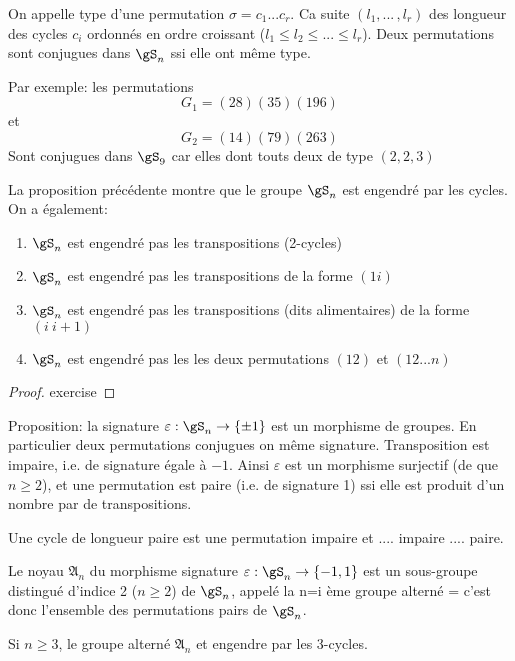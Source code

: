 \begin{proposition}
	On appelle type d'une permutation $\sigma=c_1... c_r$. Ca suite $(l_1,...\,,l_r)$ des longueur des cycles $c_i$ ordonnés en ordre croissant ($l_1\leq l_2\leq ... \leq l_r$).
	Deux permutations sont conjugues dans $\gS_n$ ssi elle ont même type.
\end{proposition}

Par exemple: les permutations
$$G_1=(28)(35)(196)$$
et
$$G_2=(14)(79)(263)$$
Sont conjugues dans $\gS_9$ car elles dont touts deux de type $(2,2,3)$


La proposition précédente montre que le groupe $\gS_n$ est engendré par les cycles. On a également:

\begin{theorem}
	\leavevmode
	\begin{enumerate}
		\item $\gS_n$ est engendré pas les transpositions (2-cycles)
		\item $\gS_n$ est engendré pas les transpositions de la forme $(1 i)$
		\item $\gS_n$ est engendré pas les transpositions (dits alimentaires) de la forme $(i\ i+1)$
		\item $\gS_n$ est engendré pas les les deux permutations $(12)$ et $(12...n)$
	\end{enumerate}
	
\end{theorem}
\begin{proof}
	exercise
\end{proof}

Proposition: la signature $\varepsilon : \gS_n\rightarrow\{\pm 1\}$ est un morphisme de groupes. En particulier deux permutations conjugues on même signature.
Transposition est impaire, i.e. de signature égale à $-1$.
Ainsi $\varepsilon$ est un morphisme surjectif (de que $n\geq 2$), et une permutation est paire (i.e. de signature 1) ssi elle est produit d'un nombre par de transpositions.

Une cycle de longueur paire est une permutation impaire et .... impaire .... paire.

Le noyau $\mathfrak{A}_n$ du morphisme signature $\varepsilon:\gS_n\rightarrow\{-1, 1\}$ est un sous-groupe distingué d'indice 2 ($n\geq2$) de $\gS_n$, appelé la n=i ème groupe alterné = c'est donc l'ensemble des permutations pairs de $\gS_n$.

\begin{proposition}
	Si $n\geq 3$, le groupe alterné $\mathfrak{A}_n$ et engendre par les 3-cycles.
\end{proposition}

